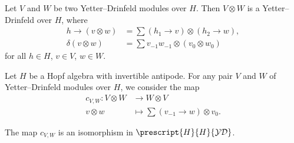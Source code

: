 \documentclass[12pt]{amsproc}
\newcommand{\ydH}{\prescript{H}{H}{\mathcal{YD}}}
\begin{document}
\begin{exercise}\label{xca:YD_tensor}
Let $V$ and $W$ be two Yetter--Drinfeld modules over $H$. Then $V\otimes W$ is a
Yetter--Drinfeld over $H$, where 
\begin{align*}
h\rightarrow(v\otimes w) & =\sum (h_{1}\rightarrow v)\otimes(h_{2}\rightarrow w),\\
\delta(v\otimes w) & =\sum v_{-1}w_{-1}\otimes(v_{0}\otimes w_{0})
\end{align*}
for all $h\in H$, $v\in V$, $w\in W$.
\end{exercise}

Let $H$ be a Hopf algebra with invertible antipode. For any pair $V$ and $W$ of
Yetter--Drinfeld modules over $H$, we consider the map 
\begin{align*}
c_{V,W}\colon V\otimes W&\to W\otimes V\\
v\otimes w&\mapsto \sum (v_{-1}\rightarrow w)\otimes v_{0}.
\end{align*}

\begin{proposition}
The map $c_{V,W}$ is an isomorphism in $\ydH$.
\end{proposition}
\end{document}
